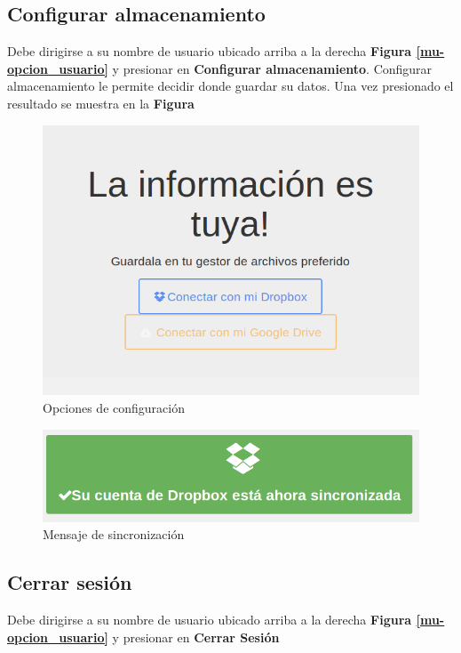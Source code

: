 \subsection{Configurar almacenamiento}
Debe dirigirse a su nombre de usuario ubicado arriba a la derecha \textbf{Figura \ref{mu-opcion_usuario}} y presionar en \textbf{Configurar almacenamiento}. Configurar almacenamiento le permite decidir donde guardar su datos. Una vez presionado el resultado se muestra en la \textbf{Figura}

\begin{figure}
	\centering
	\includegraphics[width=.8\textwidth]{img/manual_de_usuario/configurar_almacenamiento}
	\caption{Opciones de configuración}
	\label{mu-configurar_almacenamiento}
\end{figure}
\begin{figure}
	\centering
	\includegraphics[width=.8\textwidth]{img/manual_de_usuario/cuenta_sincronizada}
	\caption{Mensaje de sincronización}
	\label{mu-cuenta_sincronizada}
\end{figure}
\subsection{Cerrar sesión}
Debe dirigirse a su nombre de usuario ubicado arriba a la derecha \textbf{Figura \ref{mu-opcion_usuario}} y presionar en \textbf{Cerrar Sesión}




\stopcontents
